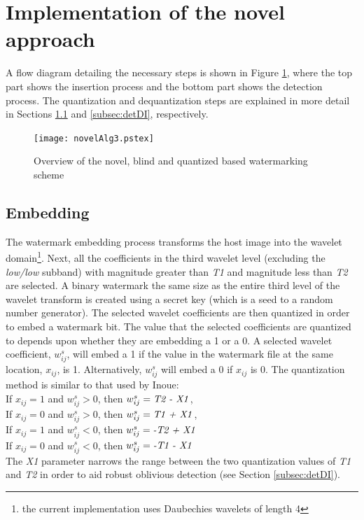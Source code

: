 \documentclass[12pt]{report}
\begin{document}
\section{Implementation of the novel approach}
A flow diagram detailing the necessary steps is shown in Figure \ref{novelAlgDI},
where the top part shows the insertion process and the bottom part shows the detection process.
The quantization and dequantization steps are explained in more
detail in Sections \ref{sub:embedDI} and \ref{subsec:detDI}, respectively.
\begin{figure}[htb]
\setlength{\abovecaptionskip}{-0.2cm}
	\begin{center}
		\texttt{[image: novelAlg3.pstex]}
	\end{center}
	\caption{Overview of the novel, blind and quantized based watermarking scheme} 
	\label{novelAlgDI}
\end{figure}

\subsection{Embedding}
\label{sub:embedDI}
The watermark embedding process transforms the host image into the wavelet domain\footnote{the
current implementation uses Daubechies wavelets of length 4}. Next, all the coefficients in the third
wavelet level (excluding the \emph{low/low} subband) with magnitude
greater than \emph{T1} and magnitude less than \emph{T2} are selected. 
A binary watermark
the same size as the 
entire third level of the wavelet transform
is created using a secret key (which is a seed to a random
number generator). The selected wavelet coefficients are then quantized 
in order to embed a watermark bit. 
The value that the selected coefficients are quantized to depends upon
whether they are embedding a 1 or a 0. A selected wavelet coefficient, $w^{s}_{ij}$,
will embed a 1 if the value in the watermark file at the same location, $x_{ij}$, is 1.
Alternatively, $w^{s}_{ij}$ will embed a 0 if $x_{ij}$ is 0.
The quantization method is similar to that used by Inoue: \\
If $x_{ij} = 1$ and $w^{s}_{ij} > 0$, then $w^{s}_{ij} = \mbox{\emph{T2 - X1}}$, \\
If $x_{ij} = 0$ and $w^{s}_{ij} > 0$, then $w^{s}_{ij} = \mbox{\emph{T1 + X1}}$, \\
If $x_{ij} = 1$ and $w^{s}_{ij} < 0$, then $w^{s}_{ij} = \mbox{\emph{-T2 + X1}}$ \\
If $x_{ij} = 0$ and $w^{s}_{ij} < 0$, then $w^{s}_{ij} = \mbox{\emph{-T1 - X1}}$ \\
The \emph{X1} parameter narrows the range between the two quantization values of \emph{T1}
and \emph{T2} in order
to aid robust oblivious detection (see Section \ref{subsec:detDI}).
\end{document}
